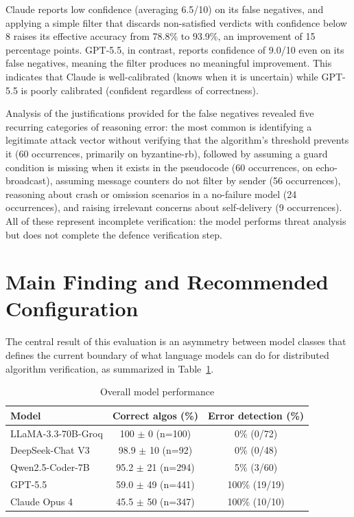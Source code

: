 \documentclass[conference]{IEEEtran}
\begin{document}
Claude reports low confidence (averaging 6.5/10) on its false negatives, and applying a simple filter that discards non-satisfied verdicts with confidence below 8 raises its effective accuracy from 78.8\% to 93.9\%, an improvement of 15 percentage points. GPT-5.5, in contrast, reports confidence of 9.0/10 even on its false negatives, meaning the filter produces no meaningful improvement. This indicates that Claude is well-calibrated (knows when it is uncertain) while GPT-5.5 is poorly calibrated (confident regardless of correctness).

Analysis of the justifications provided for the false negatives revealed five recurring categories of reasoning error: the most common is identifying a legitimate attack vector without verifying that the algorithm's threshold prevents it (60 occurrences, primarily on byzantine-rb), followed by assuming a guard condition is missing when it exists in the pseudocode (60 occurrences, on echo-broadcast), assuming message counters do not filter by sender (56 occurrences), reasoning about crash or omission scenarios in a no-failure model (24 occurrences), and raising irrelevant concerns about self-delivery (9 occurrences). All of these represent incomplete verification: the model performs threat analysis but does not complete the defence verification step.

\section{Main Finding and Recommended Configuration}

The central result of this evaluation is an asymmetry between model classes that defines the current boundary of what language models can do for distributed algorithm verification, as summarized in Table~\ref{tab:overall}.

\begin{table}[h]
\centering
\caption{Overall model performance}
\label{tab:overall}
\begin{tabular}{|l|c|c|}
\hline
\textbf{Model} & \textbf{Correct algos (\%)} & \textbf{Error detection (\%)} \\
\hline
LLaMA-3.3-70B-Groq & 100 $\pm$ 0 (n=100) & 0\% (0/72) \\
DeepSeek-Chat V3 & 98.9 $\pm$ 10 (n=92) & 0\% (0/48) \\
Qwen2.5-Coder-7B & 95.2 $\pm$ 21 (n=294) & 5\% (3/60) \\
GPT-5.5 & 59.0 $\pm$ 49 (n=441) & 100\% (19/19) \\
Claude Opus 4 & 45.5 $\pm$ 50 (n=347) & 100\% (10/10) \\
\hline
\end{tabular}
\end{table}
\end{document}
